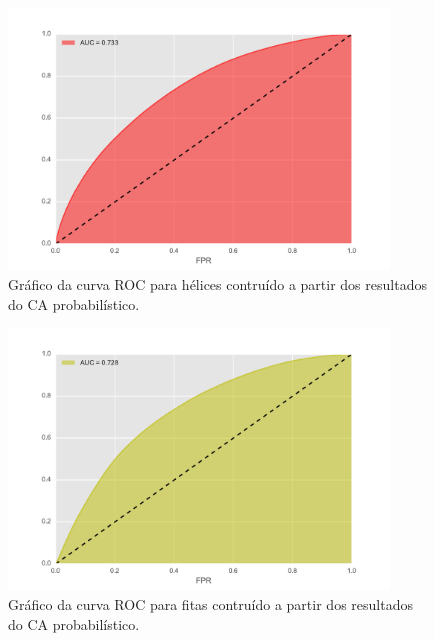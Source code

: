 \begin{figure}
	\centering
	\includegraphics[width=0.9\textwidth]{figures/figure_roc_helix_prob.pdf}
	\caption{Gráfico da curva ROC para hélices contruído a partir dos resultados do CA probabilístico.}
	\label{fig:roc_helix_prob}
\end{figure}

\begin{figure}
	\centering
	\includegraphics[width=0.9\textwidth]{figures/figure_roc_strand_prob.pdf}
	\caption{Gráfico da curva ROC para fitas contruído a partir dos resultados do CA probabilístico.}
	\label{fig:roc_strand_prob}
\end{figure}


